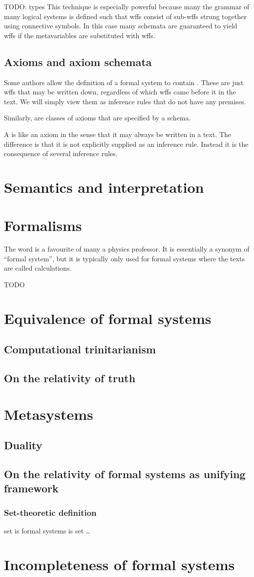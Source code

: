 TODO: types
This technique is especially powerful because many the grammar of many logical systems is defined such that wffs consist of sub-wffs strung together using connective symbols. In this case many schemata are guaranteed to yield wffs if the metavariables are substituted with wffs. 

\subsection{Axioms and axiom schemata}
Some authors allow the definition of a formal system to contain . These are just wffs that may be written down, regardless of which wffs came before it in the text. We will simply view them as inference rules that do not have any premises. 

Similarly,  are classes of axioms that are specified by a schema.

A  is like an axiom in the sense that it may always be written in a text. The difference is that it is not explicitly supplied as an inference rule. Instead it is the consequence of several inference rules.

\section{Semantics and interpretation}

\section{Formalisms}
The word  is a favourite of many a physics professor. It is essentially a synonym of ``formal system'', but it is typically only used for formal systems where the texts are called calculations.

TODO

\section{Equivalence of formal systems}
\subsection{Computational trinitarianism}
\subsection{On the relativity of truth}

\section{Metasystems}
\subsection{Duality}
\subsection{On the relativity of formal systems as unifying framework}
\subsubsection{Set-theoretic definition}
set is formal systems is set \ldots

\section{Incompleteness of formal systems}

